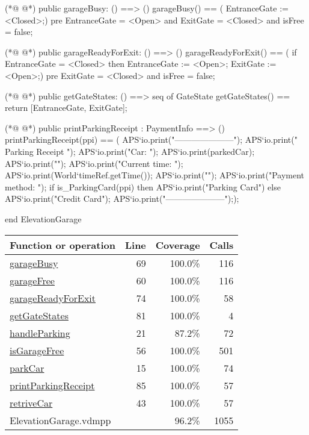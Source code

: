\begin{vdmpp}[breaklines=true]
(*@
\label{garageBusy:69}
@*)
public garageBusy: () ==> ()
garageBusy() == (
 EntranceGate := <Closed>;)
pre EntranceGate = <Open> and ExitGate = <Closed> and isFree = false;

(*@
\label{garageReadyForExit:74}
@*)
public garageReadyForExit: () ==> ()
garageReadyForExit() == (
 if EntranceGate = <Closed>
   then EntranceGate := <Open>;
 ExitGate := <Open>;)
pre ExitGate = <Closed> and isFree = false;

(*@
\label{getGateStates:81}
@*)
public getGateStates: () ==> seq of GateState
getGateStates() ==
 return [EntranceGate, ExitGate];

(*@
\label{printParkingReceipt:85}
@*)
public printParkingReceipt : PaymentInfo ==> ()
printParkingReceipt(ppi) == (
  APS`io.print("---------------------\n"); 
  APS`io.print("  Parking Receipt  \n"); 
  APS`io.print("Car: "); APS`io.print(parkedCar); APS`io.print("\n");
  APS`io.print("Current time: "); APS`io.print(World`timeRef.getTime()); APS`io.print("\n");
  APS`io.print("Payment method: ");
  if is_ParkingCard(ppi)
   then APS`io.print("Parking Card\n")
  else APS`io.print("Credit Card\n");
  APS`io.print("---------------------\n"););

end ElevationGarage
\end{vdmpp}
\bigskip
\begin{longtable}{|l|r|r|r|}
\hline
Function or operation & Line & Coverage & Calls \\
\hline
\hline
\hyperref[garageBusy:69]{garageBusy} & 69&100.0\% & 116 \\
\hline
\hyperref[garageFree:60]{garageFree} & 60&100.0\% & 116 \\
\hline
\hyperref[garageReadyForExit:74]{garageReadyForExit} & 74&100.0\% & 58 \\
\hline
\hyperref[getGateStates:81]{getGateStates} & 81&100.0\% & 4 \\
\hline
\hyperref[handleParking:21]{handleParking} & 21&87.2\% & 72 \\
\hline
\hyperref[isGarageFree:56]{isGarageFree} & 56&100.0\% & 501 \\
\hline
\hyperref[parkCar:15]{parkCar} & 15&100.0\% & 74 \\
\hline
\hyperref[printParkingReceipt:85]{printParkingReceipt} & 85&100.0\% & 57 \\
\hline
\hyperref[retriveCar:43]{retriveCar} & 43&100.0\% & 57 \\
\hline
\hline
ElevationGarage.vdmpp & & 96.2\% & 1055 \\
\hline
\end{longtable}

